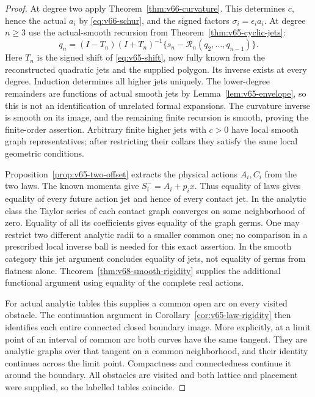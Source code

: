 \begin{proof}
At degree two apply Theorem~\ref{thm:v66-curvature}.  This determines
$c$, hence the actual $a_i$ by \eqref{eq:v66-schur}, and the signed
factors $\sigma_i=\epsilon_i a_i$.  At degree $n\ge3$ use the
actual-smooth recursion from Theorem~\ref{thm:v65-cyclic-jets}:
\[
 q_n=(I-T_n)(I+T_n)^{-1}
                 \{s_n-\mathcal R_n(q_2,\ldots,q_{n-1})\}.
\]
Here $T_n$ is the signed shift of \eqref{eq:v65-shift}, now fully
known from the reconstructed quadratic jets and the supplied polygon.
Its inverse exists at every degree.  Induction determines all higher
jets uniquely.  The lower-degree remainders are functions of actual
smooth jets by Lemma~\ref{lem:v65-envelope}, so this is not an
identification of unrelated formal expansions.  The curvature inverse is
smooth on its image, and the remaining finite recursion is smooth, proving
the finite-order assertion.  Arbitrary finite higher jets with $c>0$
have local smooth graph representatives; after restricting their collars
they satisfy the same local geometric conditions.

Proposition~\ref{prop:v65-two-offset} extracts the physical actions
$A_i,C_i$ from the two laws.  The known momenta give
$S_i^-=A_i+p_i x$.  Thus equality of laws gives equality of every
future action jet and hence of every contact jet.  In the analytic class
the Taylor series of each contact graph converges on some neighborhood
of zero.  Equality of all its coefficients gives equality of the graph
germs.  One may restrict two different analytic radii to a smaller common
one; no comparison in a prescribed local inverse ball is needed for this
exact assertion.  In the smooth category this jet argument concludes
equality of jets, not equality of germs from flatness alone.
Theorem~\ref{thm:v68-smooth-rigidity} supplies the additional
functional argument using equality of the complete real actions.

For actual analytic tables this supplies a common open arc on every
visited obstacle.  The continuation argument in
Corollary~\ref{cor:v65-law-rigidity} then identifies each entire
connected closed boundary image.  More explicitly, at a limit point of
an interval of common arc both curves have the same tangent.  They are
analytic graphs over that tangent on a common neighborhood, and their
identity continues across the limit point.  Compactness and connectedness
continue it around the boundary.  All obstacles are visited and both
lattice and placement were supplied, so the labelled tables coincide.
\end{proof}

